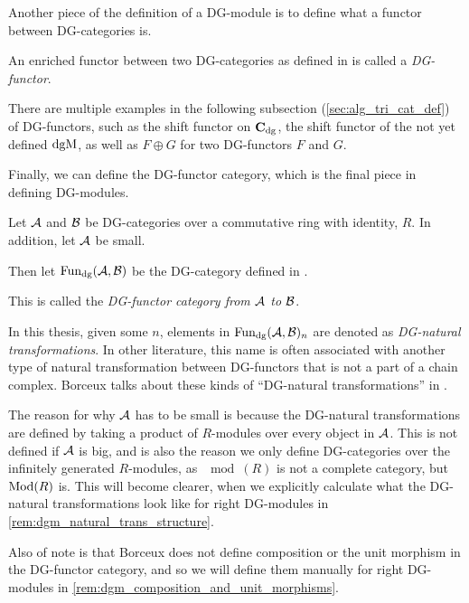 Another piece of the definition of a DG-module is to define what a functor between DG-categories is.

\begin{definition}[DG-functor]
    An enriched functor between two DG-categories as defined in \cite[Definition 6.2.3]{Borceux_1994} is called a \emph{DG-functor}.
\end{definition}

There are multiple examples in the following subsection (\autoref{sec:alg_tri_cat_def}) of DG-functors, such as the shift functor on \( \operatorname{\mathbf{C}}_{\operatorname{dg}} \), the shift functor of the not yet defined \( \operatorname{dgM} \), as well as \( F \oplus G \) for two DG-functors \( F \) and \( G \).

Finally, we can define the DG-functor category, which is the final piece in defining DG-modules.

\begin{definition}
    \label{def:dg_functor_category}
    Let \( {\mathcal{A}} \) and \( {\mathcal{B}} \) be DG-categories over a commutative ring with identity, \( R \). In addition, let \( {\mathcal{A}} \) be small.

    Then let \( \operatorname{Fun}_{\operatorname{dg}}({\mathcal{A}}, {\mathcal{B}}) \) be the DG-category defined in \cite[Proposition 6.3.1]{Borceux_1994}.

    This is called the \emph{DG-functor category from \( {\mathcal{A}} \) to \( {\mathcal{B}} \)}.
\end{definition}

In this thesis, given some \( n \), elements in \( \operatorname{Fun}_{\operatorname{dg}}({\mathcal{A}}, {\mathcal{B}})_n \) are denoted as \emph{DG-natural transformations}. In other literature, this name is often associated with another type of natural transformation between DG-functors that is not a part of a chain complex. Borceux talks about these kinds of ``DG-natural transformations'' in \cite[Definition 6.2.4]{Borceux_1994}.

The reason for why \( {\mathcal{A}} \) has to be small is because the DG-natural transformations are defined by taking a product of \( R \)-modules over every object in \( {\mathcal{A}} \). This is not defined if \( {\mathcal{A}} \) is big, and is also the reason we only define DG-categories over the infinitely generated \( R \)-modules, as \( \mod(R) \) is not a complete category, but \( \operatorname{Mod}(R) \) is. This will become clearer, when we explicitly calculate what the DG-natural transformations look like for right DG-modules in \autoref{rem:dgm_natural_trans_structure}.

Also of note is that Borceux does not define composition or the unit morphism in the DG-functor category, and so we will define them manually for right DG-modules in \autoref{rem:dgm_composition_and_unit_morphisms}.

